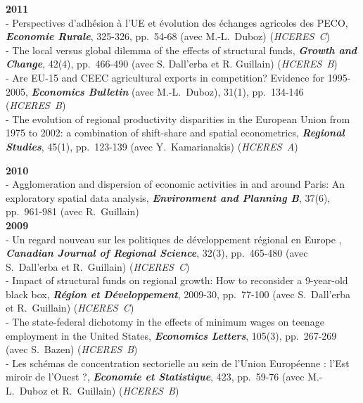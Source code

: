 \documentclass[a4paper,12pt]{article}
\begin{document}
\noindent \textbf{2011}  \smallskip \\ 
- Perspectives d'adhésion à l'UE et évolution des échanges agricoles des PECO, \textit{\textbf{Economie Rurale}}, 325-326, pp.~54-68 (avec M.-L.~Duboz) (\textit{HCERES~C}) \\
 - The local versus global dilemma of the effects of structural funds, \textit{\textbf{Growth and Change}}, 42(4), pp.~466-490 (avec S. Dall'erba et R. Guillain) (\textit{HCERES~B}) \\
 - Are EU-15 and CEEC agricultural exports in competition? Evidence for 1995-2005, \textit{\textbf{Economics Bulletin}} (avec M.-L.~Duboz), 31(1), pp.~134-146 (\textit{HCERES~B}) \\
 - The evolution of regional productivity disparities in the European Union from 1975 to 2002: a combination of shift-share and spatial econometrics, \textit{\textbf{Regional Studies}}, 45(1), pp.~123-139 (avec Y.~Kamarianakis) (\textit{HCERES~A}) \\

\newpage

\noindent \textbf{2010}  \smallskip \\ 
- Agglomeration and dispersion of economic activities in and around Paris: An exploratory spatial data analysis, \textit{\textbf{Environment and Planning B}}, 37(6), pp.~961-981 (avec R.~Guillain) \\

\noindent \textbf{2009}  \smallskip \\ 
- Un regard nouveau sur les politiques de développement régional en Europe , \textit{\textbf{Canadian Journal of Regional Science}}, 32(3), pp.~465-480 (avec S.~Dall'erba et R.~Guillain) (\textit{HCERES~C}) \\
 - Impact of structural funds on regional growth: How to reconsider a 9-year-old black box, \textit{\textbf{Région et Développement}}, 2009-30, pp.~77-100 (avec S.~Dall'erba et R.~Guillain) (\textit{HCERES~C}) \\
 - The state-federal dichotomy in the effects of minimum wages on teenage employment in the United States, \textit{\textbf{Economics Letters}}, 105(3), pp.~267-269 (avec S.~Bazen) (\textit{HCERES~B}) \\
 - Les schémas de concentration sectorielle au sein de l'Union Européenne : l'Est miroir de l'Ouest ?, \textit{\textbf{Economie et Statistique}}, 423, pp.~59-76 (avec M.-L.~Duboz et R.~Guillain) (\textit{HCERES~B}) \\
\end{document}
